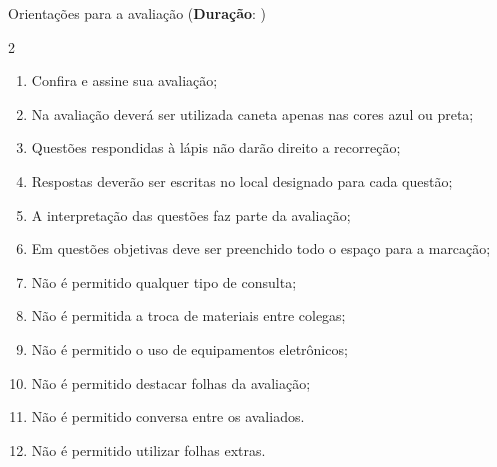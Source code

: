 \begin{framed}
	\begin{center}
		Orientações para a avaliação (\textbf{Duração}: \underline{\duracao})
	\end{center}
		\begin{multicols}{2}
		{\footnotesize
		\begin{enumerate}
		\itemsep0em
		\item Confira e assine sua avaliação;
		\item Na avaliação deverá ser utilizada caneta apenas nas cores azul ou preta;
		\item Questões respondidas à lápis não darão direito a recorreção;
		\item Respostas deverão ser escritas no local designado para cada questão;
		\item A interpretação das questões faz parte da avaliação;
		\item Em questões objetivas deve ser preenchido todo o espaço para a marcação;
		\item Não é permitido qualquer tipo de consulta;
		\item Não é permitida a troca de materiais entre colegas;
		\item Não é permitido o uso de equipamentos eletrônicos;
		\item Não é permitido destacar folhas da avaliação;
		\item Não é permitido conversa entre os avaliados.		
		\item Não é permitido utilizar folhas extras.
		\end{enumerate}
		}
		\end{multicols}
\end{framed}